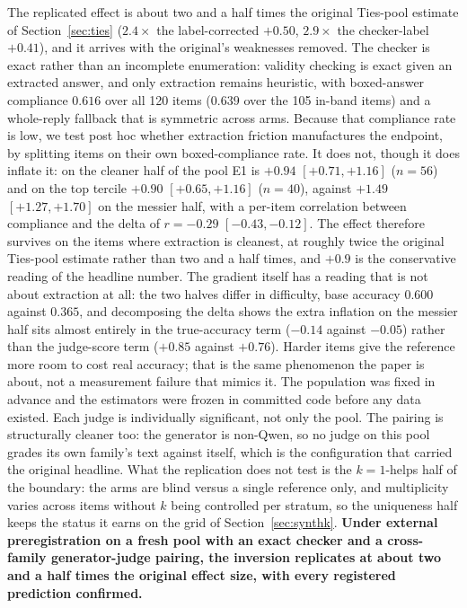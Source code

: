 \documentclass[11pt]{article}
\begin{document}
The replicated effect is about two and a half times the original Ties-pool estimate of Section~\ref{sec:ties} ($2.4\times$ the label-corrected $+0.50$, $2.9\times$ the checker-label $+0.41$), and it arrives with the original's weaknesses removed.
The checker is exact rather than an incomplete enumeration: validity checking is exact given an extracted answer, and only extraction remains heuristic, with boxed-answer compliance $0.616$ over all 120 items ($0.639$ over the 105 in-band items) and a whole-reply fallback that is symmetric across arms.
Because that compliance rate is low, we test post hoc whether extraction friction manufactures the endpoint, by splitting items on their own boxed-compliance rate.
It does not, though it does inflate it: on the cleaner half of the pool E1 is $+0.94$ $[+0.71, +1.16]$ ($n{=}56$) and on the top tercile $+0.90$ $[+0.65, +1.16]$ ($n{=}40$), against $+1.49$ $[+1.27, +1.70]$ on the messier half, with a per-item correlation between compliance and the delta of $r{=}-0.29$ $[-0.43, -0.12]$.
The effect therefore survives on the items where extraction is cleanest, at roughly twice the original Ties-pool estimate rather than two and a half times, and $+0.9$ is the conservative reading of the headline number.
The gradient itself has a reading that is not about extraction at all: the two halves differ in difficulty, base accuracy $0.600$ against $0.365$, and decomposing the delta shows the extra inflation on the messier half sits almost entirely in the true-accuracy term ($-0.14$ against $-0.05$) rather than the judge-score term ($+0.85$ against $+0.76$).
Harder items give the reference more room to cost real accuracy; that is the same phenomenon the paper is about, not a measurement failure that mimics it.
The population was fixed in advance and the estimators were frozen in committed code before any data existed.
Each judge is individually significant, not only the pool.
The pairing is structurally cleaner too: the generator is non-Qwen, so no judge on this pool grades its own family's text against itself, which is the configuration that carried the original headline.
What the replication does not test is the $k{=}1$-helps half of the boundary: the arms are blind versus a single reference only, and multiplicity varies across items without $k$ being controlled per stratum, so the uniqueness half keeps the status it earns on the grid of Section~\ref{sec:synthk}.
\textbf{Under external preregistration on a fresh pool with an exact checker and a cross-family generator-judge pairing, the inversion replicates at about two and a half times the original effect size, with every registered prediction confirmed.}
\end{document}
